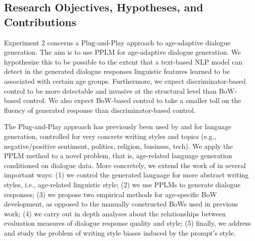 \subsection{Research Objectives, Hypotheses, and Contributions}

Experiment 2 concerns a Plug-and-Play approach to age-adaptive dialogue generation.
The aim is to use PPLM for age-adaptive dialogue generation. We hypothesize this to be possible to the extent that a text-based NLP model can detect in the generated dialogue responses linguistic features learned to be associated with certain age groups. Furthermore, we expect discriminator-based control to be more detectable and invasive at the structural level than BoW-based control. We also expect BoW-based control to take a smaller toll on the fluency of generated response than discriminator-based control.

The Plug-and-Play approach has previously been used by \cite{dathathri2019plug} and \cite{madotto-etal-2020-plug} for language generation, controlled for very concrete writing styles and topics (e.g., negative/positive sentiment, politics, religion, business, tech). We apply the PPLM method to a novel problem, that is, age-related language generation conditioned on dialogue data. More concretely, we extend the work of \cite{dathathri2019plug} in several important ways: (1) we control the generated language for more abstract writing styles, i.e., age-related linguistic style; (2) we use PPLMs to generate dialogue responses; (3) we propose two empirical methods for age-specific BoW development, as opposed to the manually constructed BoWs used in previous work; (4) we carry out in depth analyses about the relationships between evaluation measures of dialogue response quality and style; (5) finally, we address and study the problem of writing style biases induced by the prompt's style.

